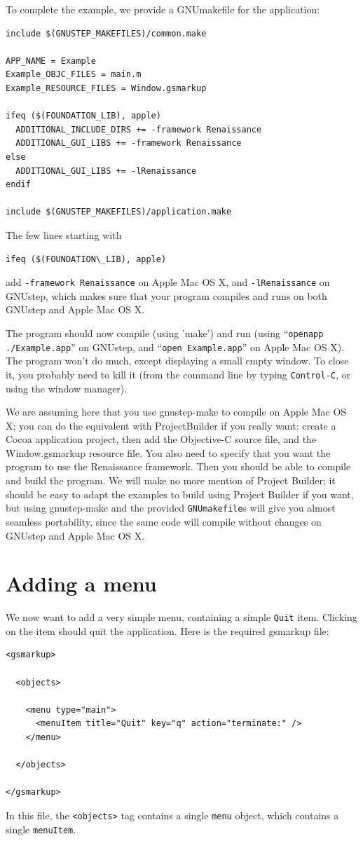 \documentclass[a4paper]{article}
\begin{document}
To complete the example, we provide a GNUmakefile for the application:
\begin{verbatim}
include $(GNUSTEP_MAKEFILES)/common.make

APP_NAME = Example
Example_OBJC_FILES = main.m
Example_RESOURCE_FILES = Window.gsmarkup

ifeq ($(FOUNDATION_LIB), apple)
  ADDITIONAL_INCLUDE_DIRS += -framework Renaissance
  ADDITIONAL_GUI_LIBS += -framework Renaissance
else
  ADDITIONAL_GUI_LIBS += -lRenaissance
endif

include $(GNUSTEP_MAKEFILES)/application.make
\end{verbatim}
The few lines starting with 
\begin{verbatim}
ifeq ($(FOUNDATION\_LIB), apple)
\end{verbatim}
add \texttt{-framework Renaissance} on Apple Mac OS X, and
\texttt{-lRenaissance} on GNUstep, which makes sure that your program
compiles and runs on both GNUstep and Apple Mac OS X.

The program should now compile (using 'make') and run (using
``\texttt{openapp ./Example.app}'' on GNUstep, and ``\texttt{open
  Example.app}'' on Apple Mac OS X).  The program won't do much,
except displaying a small empty window.  To close it, you probably
need to kill it (from the command line by typing \texttt{Control-C},
or using the window manager).

We are assuming here that you use gnustep-make to compile on Apple Mac
OS X; you can do the equivalent with ProjectBuilder if you really
want: create a Cocoa application project, then add the Objective-C
source file, and the Window.gsmarkup resource file.  You also need to
specify that you want the program to use the Renaissance framework.
Then you should be able to compile and build the program.  We will
make no more mention of Project Builder; it should be easy to adapt
the examples to build using Project Builder if you want, but using
gnustep-make and the provided \texttt{GNUmakefile}s will give you
almost seamless portability, since the same code will compile without
changes on GNUstep and Apple Mac OS X.

\section{Adding a menu}
We now want to add a very simple menu, containing a simple
\texttt{Quit} item.  Clicking on the item should quit the application.
Here is the required gsmarkup file:
\begin{verbatim}
<gsmarkup>

  <objects>

    <menu type="main">
      <menuItem title="Quit" key="q" action="terminate:" />
    </menu>
 
  </objects>

</gsmarkup>
\end{verbatim}
In this file, the \texttt{<objects>} tag contains a single
\texttt{menu} object, which contains a single \texttt{menuItem}.
\end{document}
